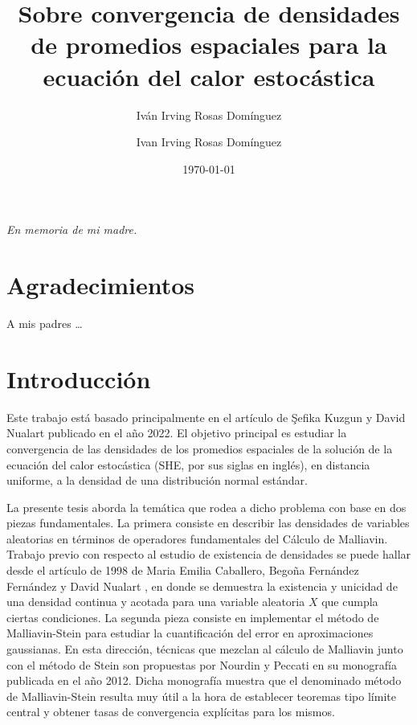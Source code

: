 \documentclass[letterpaper,twoside,12pt]{book}
\title{\textbf{}}
\author{Iván Irving Rosas Domínguez}
\date{\today}
\author{Ivan Irving Rosas Domínguez}
\title{Sobre convergencia de densidades de promedios espaciales para la ecuación del calor estocástica}
\newcommand{\1}{\mathds{1}}
\theoremstyle{definition}
\theoremstyle{definition}
\theoremstyle{remark}
\theoremstyle{definition}
\theoremstyle{definition}
\theoremstyle{definition}
\theoremstyle{definition}
\theoremstyle{definition}
\begin{document}
\maketitle 
\thispagestyle{empty}  
\frontmatter

\chapter*{}
\begin{flushright}%
 \emph{En memoria de mi madre.}
  \thispagestyle{empty}
\end{flushright}

\chapter*{Agradecimientos}

A mis padres \ldots

\tableofcontents



\chapter*{Introducción}

Este trabajo está basado principalmente en el artículo de \c{S}efika Kuzgun y David Nualart \cite{KUZGUN202268} publicado en el año 2022. El objetivo principal es estudiar la convergencia de las densidades de los promedios espaciales de la solución de la ecuación del calor estocástica (SHE, por sus siglas en inglés), en distancia uniforme, a la densidad de una distribución normal estándar. 

La presente tesis aborda la temática que rodea a dicho problema con base en dos piezas fundamentales. La primera consiste en describir las densidades de variables aleatorias en términos de operadores fundamentales del Cálculo de Malliavin. Trabajo previo con respecto al estudio de existencia de densidades se puede hallar desde el artículo de 1998 de Maria Emilia Caballero, Begoña Fernández Fernández y David Nualart \cite{Caballero1998-hz}, en donde se demuestra la existencia y unicidad de una densidad continua y acotada para una variable aleatoria $X$ que cumpla ciertas condiciones. La segunda pieza consiste en  implementar el método de Malliavin-Stein para estudiar la cuantificación del error en aproximaciones gaussianas. En esta dirección, técnicas que mezclan al cálculo de Malliavin junto con el método de Stein son propuestas por Nourdin y Peccati en su monografía \cite{Nourdin_Peccati_2012} publicada en el año 2012. Dicha monografía muestra que el denominado método de Malliavin-Stein resulta muy útil a la hora de establecer teoremas tipo límite central y obtener tasas de convergencia explícitas para los mismos. 
\end{document}

